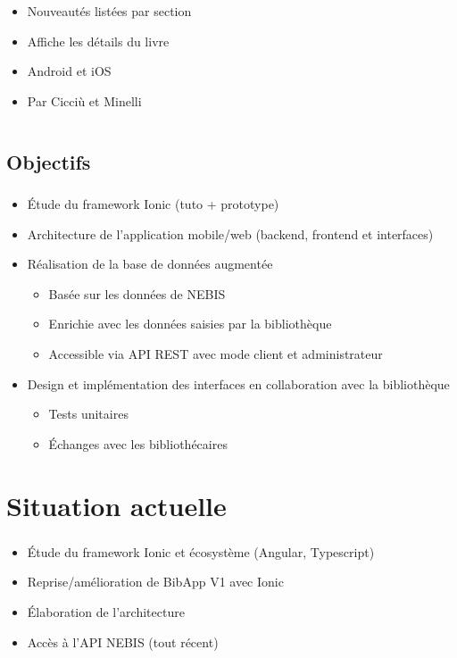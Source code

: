 \documentclass[10pt]{beamer}
\begin{document}
\begin{frame}
\begin{columns}[T]
		\begin{column}{.35\textwidth}
			\begin{itemize}
				\item Nouveautés listées par section
                \item Affiche les détails du livre
                \item Android et iOS
                \item Par Cicciù et Minelli
			\end{itemize}
		\end{column}
	\end{columns}
\end{frame}

\subsection{Objectifs}
\begin{frame}
	\frametitle{\secname}
	\framesubtitle{\subsecname}
    \begin{itemize}
        \item Étude du framework Ionic (tuto + prototype)
        \item Architecture de l'application mobile/web (backend, frontend et interfaces)
        \item Réalisation de la base de données augmentée
        \begin{itemize}
            \item Basée sur les données de NEBIS
            \item Enrichie avec les données saisies par la bibliothèque
            \item Accessible via API REST avec mode client et administrateur
        \end{itemize}
        \item Design et implémentation des interfaces en collaboration avec la bibliothèque
        \begin{itemize}
            \item Tests unitaires
            \item Échanges avec les bibliothécaires
        \end{itemize}
    \end{itemize}
\end{frame}

\section{Situation actuelle}
\begin{frame}
	\frametitle{\secname}
    \begin{itemize}
        \item Étude du framework Ionic et écosystème (Angular, Typescript)
        \item Reprise/amélioration de BibApp V1 avec Ionic
        \item Élaboration de l'architecture
        \item Accès à l'API NEBIS (tout récent)
    \end{itemize}
\end{frame}
\end{document}
